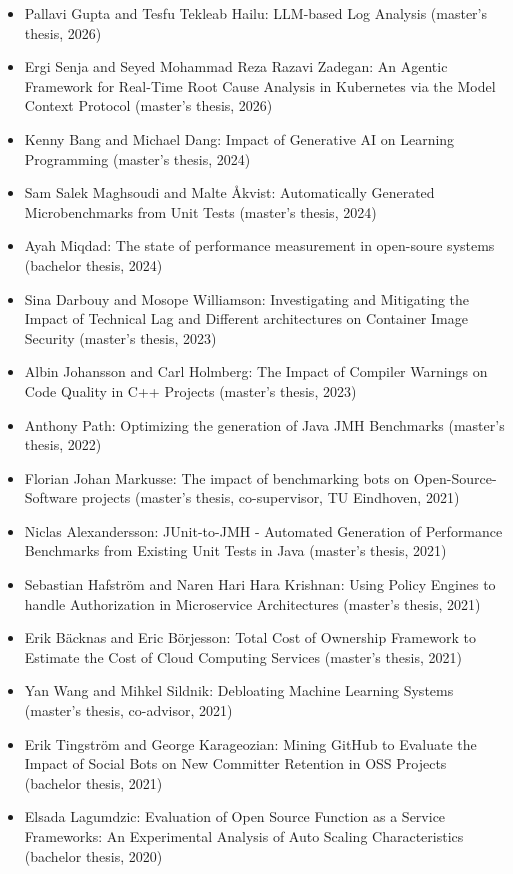 \documentclass[paper=letter,fontsize=11pt]{scrartcl} %
\begin{document}
\begin{itemize}
  \item Pallavi Gupta and Tesfu Tekleab Hailu: LLM-based Log Analysis (master's thesis, 2026)
  \item Ergi Senja and Seyed Mohammad Reza Razavi Zadegan: An Agentic Framework for Real-Time Root Cause Analysis in Kubernetes via the Model Context Protocol (master's thesis, 2026)
  \item Kenny Bang and Michael Dang: Impact of Generative AI on Learning Programming (master's thesis, 2024)
  \item Sam Salek Maghsoudi and Malte Åkvist: Automatically Generated Microbenchmarks from Unit Tests (master's thesis, 2024)
  \item Ayah Miqdad: The state of performance measurement in open-soure systems (bachelor thesis, 2024)
  \item Sina Darbouy and Mosope Williamson: Investigating and Mitigating the Impact
  of Technical Lag and Different architectures on Container Image Security (master's thesis, 2023)
  \item Albin Johansson and Carl Holmberg: The Impact of Compiler Warnings on Code Quality in C++ Projects (master's thesis, 2023)
  \item Anthony Path: Optimizing the generation of Java JMH
  Benchmarks (master's thesis, 2022)  
  \item Florian Johan Markusse: The impact of benchmarking bots on Open-Source-Software projects (master's thesis, co-supervisor, TU Eindhoven, 2021)
  \item Niclas Alexandersson: JUnit-to-JMH - Automated Generation of Performance Benchmarks from Existing Unit Tests in Java (master's thesis, 2021)
  \item Sebastian Hafström and Naren Hari Hara Krishnan: Using Policy Engines to handle
  Authorization in Microservice Architectures (master's thesis, 2021)
  \item Erik Bäcknas and  Eric Börjesson: Total Cost of Ownership Framework to Estimate the Cost of Cloud Computing Services (master's thesis, 2021)  
  \item Yan Wang and Mihkel Sildnik: Debloating Machine Learning Systems (master's thesis, co-advisor, 2021)
  \item Erik Tingström and George Karageozian: Mining GitHub to Evaluate the Impact of
  Social Bots on New Committer Retention in OSS Projects (bachelor thesis, 2021)  
	\item Elsada Lagumdzic: Evaluation of Open Source Function as a Service Frameworks: An Experimental Analysis of Auto Scaling Characteristics (bachelor thesis, 2020)

\end{itemize}
\end{document}
